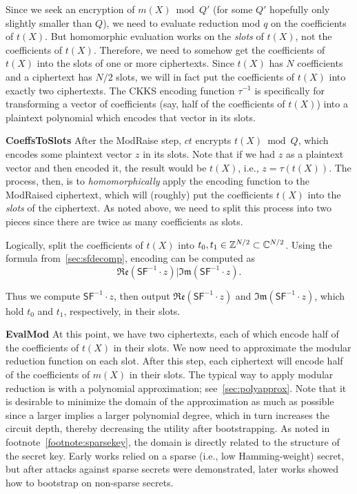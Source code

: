\documentclass[../fheimpl.tex]{subfiles}
\begin{document}
    Since we seek an encryption of $m(X) \bmod Q'$ (for some $Q'$ hopefully only slightly smaller than $Q$), we need to evaluate reduction mod $q$ on the coefficients of $t(X)$. But homomorphic evaluation works on the \emph{slots} of $t(X)$, not the coefficients of $t(X)$. Therefore, we need to somehow get the coefficients of $t(X)$ into the slots of one or more ciphertexts. Since $t(X)$ has $N$ coefficients and a ciphertext has $N/2$ slots, we will in fact put the coefficients of $t(X)$ into exactly two ciphertexts. The CKKS encoding function $\tau^{-1}$ is specifically for transforming a vector of coefficients (say, half of the coefficients of $t(X)$) into a plaintext polynomial which encodes that vector in its slots.  
    
    \textbf{CoeffsToSlots} After the ModRaise step, $ct$ encrypts $t(X)\bmod Q$, which encodes some plaintext vector $z$ in its slots. Note that if we had $z$ as a plaintext vector and then encoded it, the result would be $t(X)$, i.e., $z=\tau(t(X))$. The process, then, is to \emph{homomorphically} apply the encoding function to the ModRaised ciphertext, which will (roughly) put the coefficients $t(X)$ into the \emph{slots} of the ciphertext. As noted above, we need to split this process into two pieces since there are twice as many coefficients as slots. 
    
    Logically, split the coefficients of $t(X)$ into $t_0, t_1\in\mathbb{Z}^{N/2}\subset\mathbb{C}^{N/2}$. Using the formula from~\cref{sec:sfdecomp}, encoding can be computed as
    \[\mathfrak{Re}(\mathsf{SF}^{-1}\cdot z) | \mathfrak{Im}(\mathsf{SF}^{-1}\cdot z).\]
    
    Thus we compute $\mathsf{SF}^{-1}\cdot z$, then output $\mathfrak{Re}(\mathsf{SF}^{-1}\cdot z)$ and $ \mathfrak{Im}(\mathsf{SF}^{-1}\cdot z)$, which hold $t_0$ and $t_1$, respectively, in their slots.
    
    \textbf{EvalMod} At this point, we have two ciphertexts, each of which encode half of the coefficients of $t(X)$ in their slots. We now need to approximate the modular reduction function on each slot. After this step, each ciphertext will encode half of the coefficients of $m(X)$ in their slots. The typical way to apply modular reduction is with a polynomial approximation; see~\cref{sec:polyapprox}. 
    Note that it is desirable to minimize the domain of the approximation as much as possible since a larger implies a larger polynomial degree, which in turn increases the circuit depth, thereby decreasing the utility after bootstrapping. As noted in footnote~\ref{footnote:sparsekey}, the domain is directly related to the structure of the secret key. Early works relied on a sparse (i.e., low Hamming-weight) secret, but after attacks against sparse secrets were demonstrated, later works showed how to bootstrap on non-sparse secrets.
    
\end{document}
